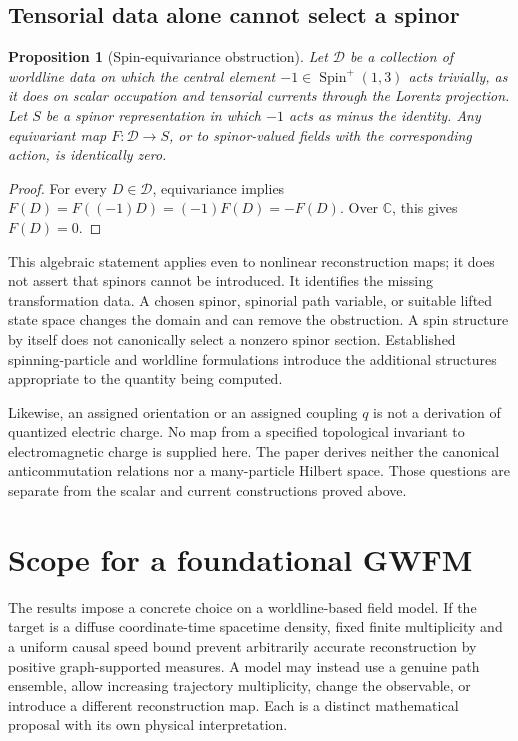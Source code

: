 \documentclass[aip,jmp,reprint,onecolumn,amsmath,amssymb]{revtex4-2}
\newtheorem{proposition}[theorem]{Proposition}
\theoremstyle{definition}
\begin{document}
\subsection{Tensorial data alone cannot select a spinor}
\begin{proposition}[Spin-equivariance obstruction]
Let $\mathcal D$ be a collection of worldline data on which the central element $-1\in\operatorname{Spin}^+(1,3)$ acts trivially, as it does on scalar occupation and tensorial currents through the Lorentz projection. Let $S$ be a spinor representation in which $-1$ acts as minus the identity. Any equivariant map $F:\mathcal D\to S$, or to spinor-valued fields with the corresponding action, is identically zero.
\end{proposition}
\begin{proof}
For every $D\in\mathcal D$, equivariance implies $F(D)=F((-1)D)=(-1)F(D)=-F(D)$. Over $\mathbb C$, this gives $F(D)=0$.
\end{proof}
This algebraic statement applies even to nonlinear reconstruction maps; it does not assert that spinors cannot be introduced. It identifies the missing transformation data. A chosen spinor, spinorial path variable, or suitable lifted state space changes the domain and can remove the obstruction. A spin structure by itself does not canonically select a nonzero spinor section. Established spinning-particle and worldline formulations introduce the additional structures appropriate to the quantity being computed.\cite{schubert}

Likewise, an assigned orientation or an assigned coupling $q$ is not a derivation of quantized electric charge. No map from a specified topological invariant to electromagnetic charge is supplied here. The paper derives neither the canonical anticommutation relations nor a many-particle Hilbert space. Those questions are separate from the scalar and current constructions proved above.

\section{Scope for a foundational GWFM}
The results impose a concrete choice on a worldline-based field model. If the target is a diffuse coordinate-time spacetime density, fixed finite multiplicity and a uniform causal speed bound prevent arbitrarily accurate reconstruction by positive graph-supported measures. A model may instead use a genuine path ensemble, allow increasing trajectory multiplicity, change the observable, or introduce a different reconstruction map. Each is a distinct mathematical proposal with its own physical interpretation.
\end{document}

